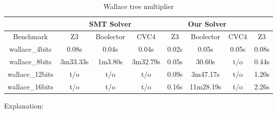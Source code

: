 \begin{table}[]
\centering
\caption{Wallace tree multiplier}
\label{my-label}
\begin{tabular}{|c|c|c|c|c|c|c|c|}
\hline
                & \multicolumn{3}{c|}{SMT Solver} & \multicolumn{3}{c|}{Our Solver} &       \\ \hline
Benchmark       & Z3       & Boolector & CVC4     & Z3      & Boolector   & CVC4    & Z3    \\ \hline
wallace\_4bits  & 0.08s    & 0.04s     & 0.04s    & 0.02s   & 0.05s       & 0.05s   & 0.08s \\ \hline
wallace\_8bits  & 3m33.33s & 1m3.80s   & 3m32.79s & 0.05s   & 30.60s      & t/o     & 0.44s \\ \hline
wallace\_12bits & t/o      & t/o       & t/o      & 0.09s   & 3m47.17s    & t/o     & 1.20s \\ \hline
wallace\_16bits & t/o      & t/o       & t/o      & 0.16s   & 11m28.19s   & t/o     & 2.26s \\ \hline
\end{tabular}
\end{table}


Explanation:







 

